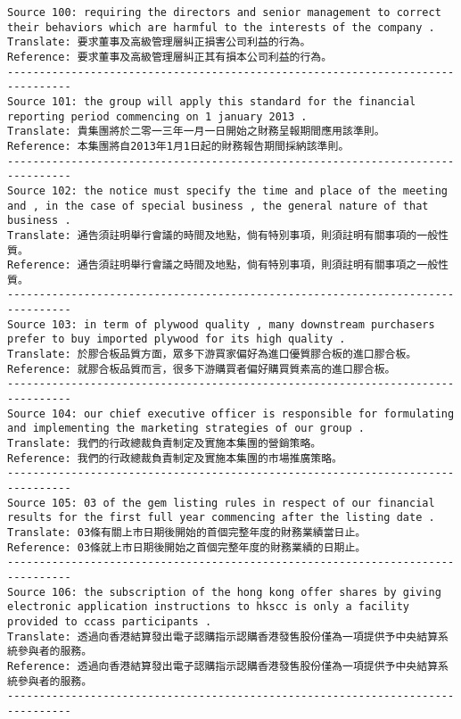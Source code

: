 \documentclass[11pt]{article}
\begin{document}
    \begin{Verbatim}[commandchars=\\\{\}]
Source 100: requiring the directors and senior management to correct their behaviors which are harmful to the interests of the company .
Translate: 要求董事及高級管理層糾正損害公司利益的行為。
Reference: 要求董事及高級管理層糾正其有損本公司利益的行為。
--------------------------------------------------------------------------------
Source 101: the group will apply this standard for the financial reporting period commencing on 1 january 2013 .
Translate: 貴集團將於二零一三年一月一日開始之財務呈報期間應用該準則。
Reference: 本集團將自2013年1月1日起的財務報告期間採納該準則。
--------------------------------------------------------------------------------
Source 102: the notice must specify the time and place of the meeting and , in the case of special business , the general nature of that business .
Translate: 通告須註明舉行會議的時間及地點，倘有特別事項，則須註明有關事項的一般性質。
Reference: 通告須註明舉行會議之時間及地點，倘有特別事項，則須註明有關事項之一般性質。
--------------------------------------------------------------------------------
Source 103: in term of plywood quality , many downstream purchasers prefer to buy imported plywood for its high quality .
Translate: 於膠合板品質方面，眾多下游買家偏好為進口優質膠合板的進口膠合板。
Reference: 就膠合板品質而言，很多下游購買者偏好購買質素高的進口膠合板。
--------------------------------------------------------------------------------
Source 104: our chief executive officer is responsible for formulating and implementing the marketing strategies of our group .
Translate: 我們的行政總裁負責制定及實施本集團的營銷策略。
Reference: 我們的行政總裁負責制定及實施本集團的市場推廣策略。
--------------------------------------------------------------------------------
Source 105: 03 of the gem listing rules in respect of our financial results for the first full year commencing after the listing date .
Translate: 03條有關上市日期後開始的首個完整年度的財務業績當日止。
Reference: 03條就上市日期後開始之首個完整年度的財務業績的日期止。
--------------------------------------------------------------------------------
Source 106: the subscription of the hong kong offer shares by giving electronic application instructions to hkscc is only a facility provided to ccass participants .
Translate: 透過向香港結算發出電子認購指示認購香港發售股份僅為一項提供予中央結算系統參與者的服務。
Reference: 透過向香港結算發出電子認購指示認購香港發售股份僅為一項提供予中央結算系統參與者的服務。
--------------------------------------------------------------------------------

\end{Verbatim}
\end{document}
